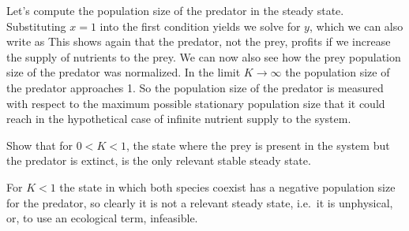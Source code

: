 Let's compute the population size of the predator in the steady state. Substituting $x=1$ into the first condition yields 
we solve for $y$,
which we can also write as 
This shows again that the predator, not the prey, profits if we increase the supply of nutrients to the prey. We can now also see how the prey population size of the predator was normalized. In the limit $K\to \infty$ the population size of the predator approaches 1. So the population size of the predator is measured with respect to the maximum possible stationary population size that it could reach in the hypothetical case of infinite nutrient supply to the system. 

\subquestion
Show that for $0<K<1$, the state where the prey is present in the system but the predator is extinct, is the only relevant stable steady state. 

\solution
For $K<1$ the state in which both species coexist has a negative population size for the predator, so clearly it is not a relevant steady state, i.e.~it is unphysical, or, to use an ecological term, infeasible. 

